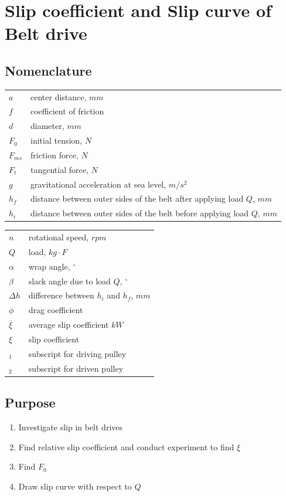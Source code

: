 \chapter{Slip coefficient and Slip curve of Belt drive}
\section{Nomenclature}
\begin{tabular}[t]{lp{7cm}}
	$ a $ & center distance, $ mm $\\
	$ f $ & coefficient of friction\\
	$ d $ & diameter, $ mm $\\
	$ F_0 $ & initial tension, $ N $\\
	$ F_{ms} $ & friction force, $ N $\\
	$ F_t $ & tangential force, $ N $\\ 
	$ g $ & gravitational acceleration at sea level, $ m/s^2 $\\
	$ h_f $ & distance between outer sides of the belt after applying load $ Q $, $ mm $\\
	$ h_i $ & distance between outer sides of the belt before applying load $ Q $, $ mm $\\	
\end{tabular}
\begin{tabular}[t]{lp{7cm}}
	$ n $ & rotational speed, $ rpm $\\
	$ Q $ & load, $ kg\cdot F $\\
	$ \alpha $ & wrap angle, $ ^{\circ} $\\
	$ \beta $ & slack angle due to load $ Q $, $ ^{\circ} $\\
	$ \Delta h $ & difference between $ h_i $ and $ h_f $, $ mm $\\
	$ \phi $ & drag coefficient\\
	$ \overline{\xi} $ & average slip coefficient $ kW $\\
	$ \xi $ & slip coefficient\\	
	$ _1 $ & subscript for driving pulley\\
	$ _2 $ & subscript for driven pulley\\
\end{tabular}
\section{Purpose}
\begin{enumerate}
	\item Investigate slip in belt drives
	\item Find relative slip coefficient and conduct experiment to find $ \xi $
	\item Find $ F_0 $
	\item Draw slip curve with respect to $ Q $
\end{enumerate}

